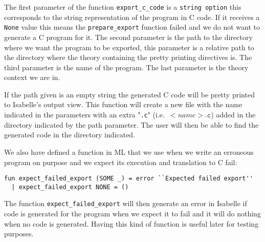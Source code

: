 The first parameter of the function \verb|export_c_code| is a \verb|string option| this corresponds to the string representation of the program in C code.
If it receives a \verb|None| value this means the \verb|prepare_export| function failed and we do not want to generate a C program for it.
The second parameter is the path to the directory where we want the program to be exported, this parameter is a relative path to the directory where the theory containing the pretty printing directives is.
The third parameter is the name of the program.
The last parameter is the theory context we are in.

If the path given is an empty string the generated C code will be pretty printed to Isabelle's output view.
This function will create a new file with the name indicated in the parameters with an extra "\verb|.c|" (i.e.\ $<name>\mathtt{.c}$) added in the directory indicated by the path parameter.
The user will then be able to find the generated code in the directory indicated.

We also have defined a function in ML that we use when we write an erroneous program on purpose and we expect its execution and translation to C fail:

\begin{lstlisting}
fun expect_failed_export (SOME _) = error ``Expected failed export''
  | expect_failed_export NONE = ()
\end{lstlisting}

The function \verb|expect_failed_export| will then generate an error in Isabelle if code is generated for the program when we expect it to fail and it will do nothing when no code is generated.
Having this kind of function is useful later for testing purposes.
